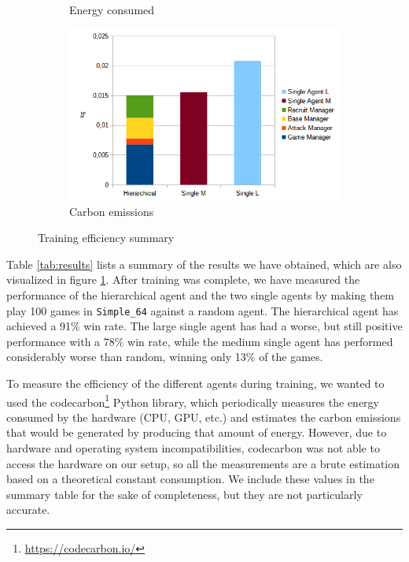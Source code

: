 \begin{figure}[t]
\begin{subfigure}[b]{0.48\textwidth}
        \caption{Energy consumed}
    \end{subfigure}
    \hfill
    \begin{subfigure}[b]{0.48\textwidth}
        \includegraphics[width=1\textwidth]{figs/training_emissions.png}
        \caption{Carbon emissions}
    \end{subfigure}
    \caption{Training efficiency summary}
    \label{fig:results}
\end{figure}

Table \ref{tab:results} lists a summary of the results we have obtained, which are also visualized in figure \ref{fig:results}. After training was complete, we have measured the performance of the hierarchical agent and the two single agents by making them play 100 games in \texttt{Simple\_64} against a random agent. The hierarchical agent has achieved a 91\% win rate. The large single agent has had a worse, but still positive performance with a 78\% win rate, while the medium single agent has performed considerably worse than random, winning only 13\% of the games.

To measure the efficiency of the different agents during training, we wanted to used the codecarbon\footnote{\url{https://codecarbon.io/}} Python library, which periodically measures the energy consumed by the hardware (CPU, GPU, etc.) and estimates the carbon emissions that would be generated by producing that amount of energy. However, due to hardware and operating system incompatibilities, codecarbon was not able to access the hardware on our setup, so all the measurements are a brute estimation based on a theoretical constant consumption. We include these values in the summary table for the sake of completeness, but they are not particularly accurate.

